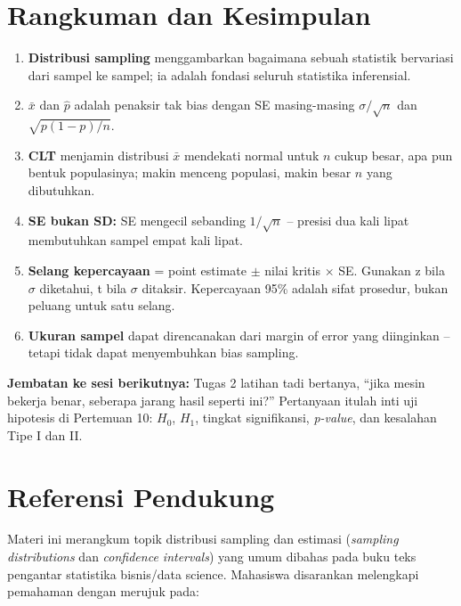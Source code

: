 \documentclass[
  indonesian,
  letterpaper,
]{book}
\providecommand{\tightlist}{%
  \setlength{\itemsep}{0pt}\setlength{\parskip}{0pt}}
\begin{document}
\section{Rangkuman dan Kesimpulan}\label{rangkuman-dan-kesimpulan}

\begin{enumerate}
\def\labelenumi{\arabic{enumi}.}
\tightlist
\item
  \textbf{Distribusi sampling} menggambarkan bagaimana sebuah statistik
  bervariasi dari sampel ke sampel; ia adalah fondasi seluruh statistika
  inferensial.
\item
  \(\bar{x}\) dan \(\hat{p}\) adalah penaksir tak bias dengan SE
  masing-masing \(\sigma/\sqrt{n}\) dan \(\sqrt{p(1-p)/n}\).
\item
  \textbf{CLT} menjamin distribusi \(\bar{x}\) mendekati normal untuk
  \(n\) cukup besar, apa pun bentuk populasinya; makin menceng populasi,
  makin besar \(n\) yang dibutuhkan.
\item
  \textbf{SE bukan SD:} SE mengecil sebanding \(1/\sqrt{n}\) -- presisi
  dua kali lipat membutuhkan sampel empat kali lipat.
\item
  \textbf{Selang kepercayaan} = point estimate \(\pm\) nilai kritis
  \(\times\) SE. Gunakan z bila \(\sigma\) diketahui, t bila \(\sigma\)
  ditaksir. Kepercayaan 95\% adalah sifat prosedur, bukan peluang untuk
  satu selang.
\item
  \textbf{Ukuran sampel} dapat direncanakan dari margin of error yang
  diinginkan -- tetapi tidak dapat menyembuhkan bias sampling.
\end{enumerate}

\textbf{Jembatan ke sesi berikutnya:} Tugas 2 latihan tadi bertanya,
``jika mesin bekerja benar, seberapa jarang hasil seperti ini?''
Pertanyaan itulah inti uji hipotesis di Pertemuan 10: \(H_0\), \(H_1\),
tingkat signifikansi, \emph{p-value}, dan kesalahan Tipe I dan II.

\section{Referensi Pendukung}\label{referensi-pendukung}

Materi ini merangkum topik distribusi sampling dan estimasi
(\emph{sampling distributions} dan \emph{confidence intervals}) yang
umum dibahas pada buku teks pengantar statistika bisnis/data science.
Mahasiswa disarankan melengkapi pemahaman dengan merujuk pada:
\end{document}
